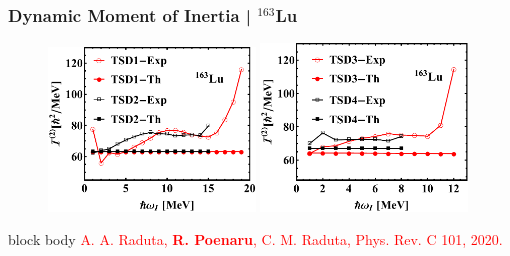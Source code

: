 \documentclass{beamer}
\begin{document}
\begin{frame}
	\frametitle{Dynamic Moment of Inertia | $^{163}$Lu}
	\begin{figure}
		\centering
		\includegraphics[width=0.49\textwidth]{figures/Lu-exp-energies/fig16a_lu163.pdf}
		\includegraphics[width=0.49\textwidth]{figures/Lu-exp-energies/fig16b_lu163.pdf}
	\end{figure}
	\begin{beamercolorbox}[rounded=true,shadow=false, wd=\linewidth,]{block body}
		\centering
		\textcolor{red}{\footnotesize{A. A. Raduta, \textbf{R. Poenaru}, C. M. Raduta, Phys. Rev. C 101, 2020.}}
	\end{beamercolorbox}
\end{frame}
\end{document}
